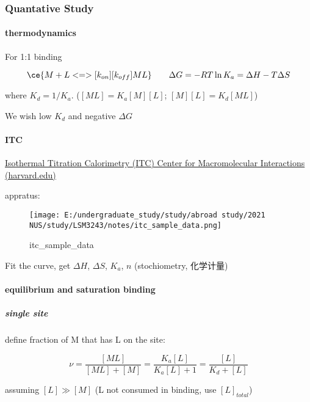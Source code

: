 \documentclass[]{article}
\let\oldparagraph\paragraph
\renewcommand{\paragraph}[1]{\oldparagraph{#1}\mbox{}}
\let\oldsubparagraph\subparagraph
\renewcommand{\subparagraph}[1]{\oldsubparagraph{#1}\mbox{}}
\begin{document}
\hypertarget{quantative-study}{%
\subsubsection{Quantative Study}\label{quantative-study}}

\hypertarget{thermodynamics}{%
\paragraph{thermodynamics}\label{thermodynamics}}

For 1:1 binding

\[\ce{M + L <=>[k_{on}][k_{off}] ML}\qquad
\Delta G=-RT\ln K_a=\Delta H-T\Delta S\]

where \(K_d=1/K_a\). (\([ML]=K_a[M][L]\); \([M][L]=K_d[ML]\))

We wish low \(K_d\) and negative \(\Delta G\)

\hypertarget{itc}{%
\paragraph{ITC}\label{itc}}

\href{https://cmi.hms.harvard.edu/isothermal-titration-calorimetry}{Isothermal
Titration Calorimetry (ITC) \textbar{} Center for Macromolecular
Interactions (harvard.edu)}

appratus:

\begin{figure}
\centering
\texttt{[image: E:/undergraduate\_study/study/abroad study/2021 NUS/study/LSM3243/notes/itc\_sample\_data.png]}
\caption{itc\_sample\_data}
\end{figure}

Fit the curve, get \(\Delta H\), \(\Delta S\), \(K_a\), \(n\)
(stochiometry, 化学计量)

\hypertarget{equilibrium-and-saturation-binding}{%
\paragraph{equilibrium and saturation
binding}\label{equilibrium-and-saturation-binding}}

\hypertarget{single-site}{%
\subparagraph{single site}\label{single-site}}

define fraction of M that has L on the site:

\[\nu=\dfrac{[ML]}{[ML]+{[M]}}=\dfrac{K_a[L]}{K_a[L]+1}=\dfrac{[L]}{K_d+[L]}\]

assuming \([L]\gg[M]\) (L not consumed in binding, use \([L]_{total}\))
\end{document}
